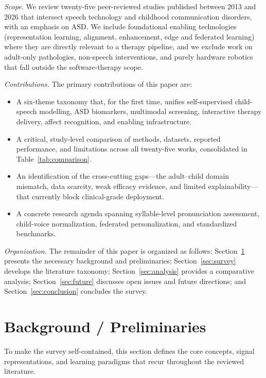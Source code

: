\documentclass[conference]{IEEEtran}
\begin{document}
\textit{Scope.} We review twenty-five peer-reviewed studies published between 2013 and 2026 that intersect speech technology and childhood communication disorders, with an emphasis on ASD. We include foundational enabling technologies (representation learning, alignment, enhancement, edge and federated learning) where they are directly relevant to a therapy pipeline, and we exclude work on adult-only pathologies, non-speech interventions, and purely hardware robotics that fall outside the software-therapy scope.

\textit{Contributions.} The primary contributions of this paper are:
\begin{itemize}
    \item A six-theme taxonomy that, for the first time, unifies self-supervised child-speech modelling, ASD biomarkers, multimodal screening, interactive therapy delivery, affect recognition, and enabling infrastructure.
    \item A critical, study-level comparison of methods, datasets, reported performance, and limitations across all twenty-five works, consolidated in Table~\ref{tab:comparison}.
    \item An identification of the cross-cutting gaps---the adult--child domain mismatch, data scarcity, weak efficacy evidence, and limited explainability---that currently block clinical-grade deployment.
    \item A concrete research agenda spanning syllable-level pronunciation assessment, child-voice normalization, federated personalization, and standardized benchmarks.
\end{itemize}

\textit{Organization.} The remainder of this paper is organized as follows: Section~\ref{sec:background} presents the necessary background and preliminaries; Section~\ref{sec:survey} develops the literature taxonomy; Section~\ref{sec:analysis} provides a comparative analysis; Section~\ref{sec:future} discusses open issues and future directions; and Section~\ref{sec:conclusion} concludes the survey.

\section{Background / Preliminaries}
\label{sec:background}
To make the survey self-contained, this section defines the core concepts, signal representations, and learning paradigms that recur throughout the reviewed literature.
\end{document}
